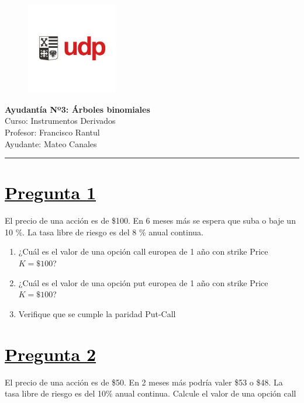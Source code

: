 \documentclass[12pt]{article}
\newcommand{\subrayadoRojo}[1]{{\color{rojoudp}\underline{\textcolor{black}{#1}}}}
\begin{document}
\begin{figure}
    \vspace{-5em}    
    \flushright
    \includegraphics[height=4cm]{../imagenes/logo.png}\\[-3em]
\end{figure}
\begin{center}
    {\LARGE \textbf{Ayudantía Nº3: Árboles binomiales}}\\[0.5em]
    Curso: Instrumentos Derivados\\
    Profesor: Francisco Rantul\\
    Ayudante: Mateo Canales\\
\end{center}
\vspace{1pt}
{\color{rojoudp}\hrule height 2pt}
\vspace{10pt}

\section*{\subrayadoRojo{Pregunta 1}}
El precio de una acción es de \$100. En 6 meses más se espera que suba o baje un 10 \%.
La tasa libre de riesgo es del 8 \% anual continua. 


\begin{enumerate}[label=\textbf{\alph*)}]
    \item	¿Cuál es el valor de una opción call europea de 1 año con strike Price $ K = \$100 $?
    \item	¿Cuál es el valor de una opción put europea de 1 año con strike Price $ K = \$100 $?
    \item   Verifique que se cumple la paridad Put-Call
\end{enumerate}

\section*{\subrayadoRojo{Pregunta 2}}
El precio de una acción es de \$50. En 2 meses más podría valer \$53 o \$48. La tasa libre de riesgo es del 10\%
anual continua. Calcule el valor de una opción call 
\end{document}
